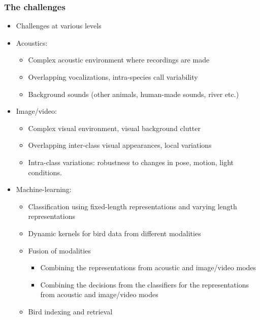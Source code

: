 \documentclass[mathserif]{beamer}
\begin{document}
\begin{frame}
\frametitle{The challenges}
\begin{itemize}
\item<2-> Challenges at various levels
\item<3-> Acoustics:
	\begin{itemize}
	\item<4-> Complex acoustic environment where recordings are made
	\item<5-> Overlapping vocalizations, intra-species call variability
	\item<6-> Background sounds (other animals, human-made sounds, river etc.)
	\end{itemize}
\item<8-> Image/video: 
	\begin{itemize}
	\item<9-> Complex visual environment, visual background clutter
	\item<10-> Overlapping inter-class visual appearances, local variations  
	\item<11-> Intra-class variations: robustness to changes in pose, motion, light conditions.
	\end{itemize}
\item<12-> Machine-learning:
	\begin{itemize}
	\item<13-> Classification using fixed-length representations 
	and varying length representations
	\item<14-> Dynamic kernels for bird data from different modalities
	\item<15-> Fusion of modalities
	\begin{itemize}
	    \item<16-> Combining the representations from acoustic and image/video modes
	    \item<17-> Combining the decisions from the classifiers for the representations from acoustic and image/video modes
	\end{itemize}
	\item<18-> Bird indexing and retrieval
	\end{itemize}
\end{itemize}
\end{frame}
\end{document}
